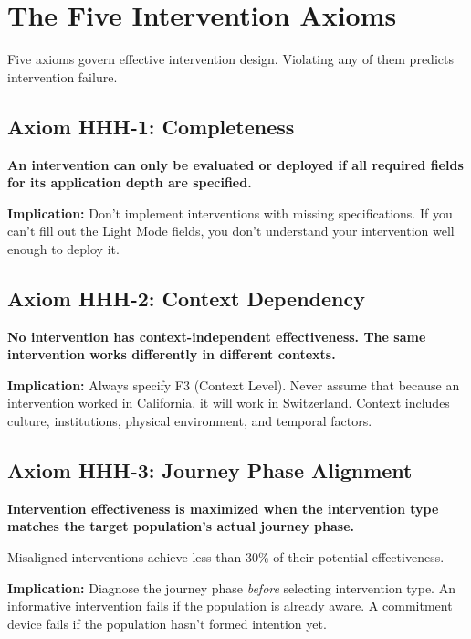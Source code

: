 \section{The Five Intervention Axioms}
\label{sec:17-axioms}

Five axioms govern effective intervention design. Violating any of them predicts intervention failure.

\subsection{Axiom HHH-1: Completeness}

\begin{tcolorbox}[colback=gray!5!white, colframe=gray!75!black,
    title=Axiom HHH-1: Intervention Completeness]
\textbf{An intervention can only be evaluated or deployed if all required fields for its application depth are specified.}

\textbf{Implication:} Don't implement interventions with missing specifications. If you can't fill out the Light Mode fields, you don't understand your intervention well enough to deploy it.
\end{tcolorbox}

\subsection{Axiom HHH-2: Context Dependency}

\begin{tcolorbox}[colback=gray!5!white, colframe=gray!75!black,
    title=Axiom HHH-2: Context Dependency]
\textbf{No intervention has context-independent effectiveness. The same intervention works differently in different contexts.}

\textbf{Implication:} Always specify F3 (Context Level). Never assume that because an intervention worked in California, it will work in Switzerland. Context includes culture, institutions, physical environment, and temporal factors.
\end{tcolorbox}

\subsection{Axiom HHH-3: Journey Phase Alignment}

\begin{tcolorbox}[colback=gray!5!white, colframe=gray!75!black,
    title=Axiom HHH-3: Journey Phase Alignment]
\textbf{Intervention effectiveness is maximized when the intervention type matches the target population's actual journey phase.}

Misaligned interventions achieve less than 30\% of their potential effectiveness.

\textbf{Implication:} Diagnose the journey phase \textit{before} selecting intervention type. An informative intervention fails if the population is already aware. A commitment device fails if the population hasn't formed intention yet.
\end{tcolorbox}

